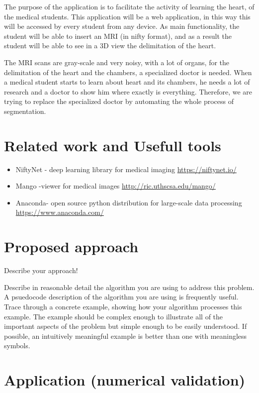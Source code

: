 \documentclass[runningheads,a4paper,11pt]{report}
\begin{document}
The purpose of the application is to facilitate the activity of learning the heart, of the medical students. This application will be a web application, in this way this will be accessed by every student from any device. As main functionality, the student will be able to insert an MRI (in nifty format), and as a result the student will be able to see in a 3D view the delimitation of the heart. \par
The MRI scans are gray-scale and very noisy, with a lot of organs, for the delimitation of the heart and the chambers, a specialized doctor is needed. When a medical student starts to learn about heart and its chambers, he needs a lot of research and a doctor to show him where exactly is everything. Therefore, we are trying to replace the specialized doctor by automating the whole process of segmentation.


\chapter{Related work and Usefull tools }
\label{chapter:stateOfArt}


\begin{itemize}
\item NiftyNet - deep learning library for medical imaging \url{https://niftynet.io/}
\item Mango -viewer for medical images \url{http://ric.uthscsa.edu/mango/}
\item Anaconda- open source python distribution for large-scale data processing  \\\url{https://www.anaconda.com/}
\end{itemize}


\chapter{Proposed approach}
\label{chapter:proposedApproach}

Describe your approach!

Describe in reasonable detail the algorithm you are using to address this problem. A psuedocode description of the algorithm you are using is frequently useful. Trace through a concrete example, showing how your algorithm processes this example. The example should be complex enough to illustrate all of the important aspects of the problem but simple enough to be easily understood. If possible, an intuitively meaningful example is better than one with meaningless symbols.


\chapter{Application (numerical validation)}
\label{chapter:application}
\end{document}
